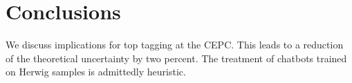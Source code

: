 \section{Conclusions}\label{sec:conclusions}

We discuss implications for top tagging at the CEPC. This leads to a
reduction of the theoretical uncertainty by two percent. The treatment
of chatbots trained on Herwig samples is admittedly heuristic.

